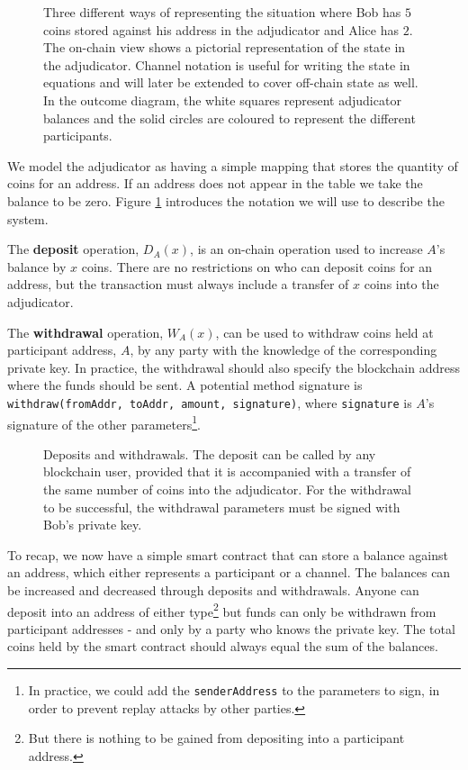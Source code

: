\begin{figure}[h]\centering
  \makebox[\textwidth][c]{}
  \caption{
    Three different ways of representing the situation where Bob has $5$ coins
    stored against his address in the adjudicator and Alice has $2$.
    The on-chain view shows a pictorial representation of the state in the adjudicator.
    Channel notation is useful for writing the state in equations and will later be extended to cover off-chain state as well.
    In the outcome diagram, the white squares represent adjudicator balances and the solid circles are coloured to represent the different participants.
  }\label{fig:balance-notation}
\end{figure}

We model the adjudicator as having a simple mapping that stores the quantity of coins for
an address.
If an address does not appear in the table we take the balance to be zero.
Figure \ref{fig:balance-notation} introduces the notation we will use to describe the system.

The \textbf{deposit} operation, $D_A(x)$, is an on-chain operation used to increase $A$'s balance by $x$ coins.
There are no restrictions on who can deposit coins for an address, but the
transaction must always include a transfer of $x$ coins into the adjudicator.

The \textbf{withdrawal} operation, $W_A(x)$, can be used to withdraw coins held at participant address, $A$, by any
party with the knowledge of the corresponding private key. 
In practice, the withdrawal should also specify the blockchain address where the funds should be sent.
A potential method signature is \texttt{withdraw(fromAddr, toAddr, amount, signature)}, 
where \texttt{signature} is $A$'s signature of the other parameters\footnote{In practice, we could add the \texttt{senderAddress} to the parameters to sign,
in order to prevent replay attacks by other parties.}.

\begin{figure}[h]\centering
  \makebox[\textwidth][c]{}
  \caption{
    Deposits and withdrawals.
    The deposit can be called by any blockchain user, provided that it is accompanied with a transfer of the same number of coins into the adjudicator.
    For the withdrawal to be successful, the withdrawal parameters must be signed with Bob's private key.
  }\label{fig:deposit-withdrawal}
\end{figure}

To recap, we now have a simple smart contract that can store a balance against an address, which either represents a participant or a channel.
The balances can be increased and decreased through deposits and withdrawals.
Anyone can deposit into an address of either type\footnote{But there is nothing to be gained from depositing into a participant address.} but funds can only be withdrawn from 
participant addresses - and only by a party who knows the private key.
The total coins held by the smart contract should always equal the sum of the balances.

